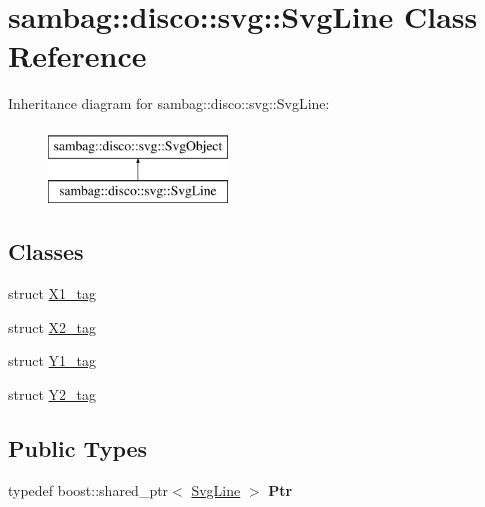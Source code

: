 \hypertarget{classsambag_1_1disco_1_1svg_1_1_svg_line}{
\section{sambag::disco::svg::SvgLine Class Reference}
\label{classsambag_1_1disco_1_1svg_1_1_svg_line}
}
Inheritance diagram for sambag::disco::svg::SvgLine:\begin{figure}[H]
\begin{center}
\leavevmode
\includegraphics[height=2.000000cm]{classsambag_1_1disco_1_1svg_1_1_svg_line}
\end{center}
\end{figure}
\subsection*{Classes}
\begin{DoxyCompactItemize}
\item 
struct \hyperlink{structsambag_1_1disco_1_1svg_1_1_svg_line_1_1_x1__tag}{X1\_\-tag}
\item 
struct \hyperlink{structsambag_1_1disco_1_1svg_1_1_svg_line_1_1_x2__tag}{X2\_\-tag}
\item 
struct \hyperlink{structsambag_1_1disco_1_1svg_1_1_svg_line_1_1_y1__tag}{Y1\_\-tag}
\item 
struct \hyperlink{structsambag_1_1disco_1_1svg_1_1_svg_line_1_1_y2__tag}{Y2\_\-tag}
\end{DoxyCompactItemize}
\subsection*{Public Types}
\begin{DoxyCompactItemize}
\item 
\hypertarget{classsambag_1_1disco_1_1svg_1_1_svg_line_a07c0eb7bc6228d7d97dbeac3ae13c7c5}{
typedef boost::shared\_\-ptr$<$ \hyperlink{classsambag_1_1disco_1_1svg_1_1_svg_line}{SvgLine} $>$ {\bfseries Ptr}}
\label{classsambag_1_1disco_1_1svg_1_1_svg_line_a07c0eb7bc6228d7d97dbeac3ae13c7c5}

\end{DoxyCompactItemize}
